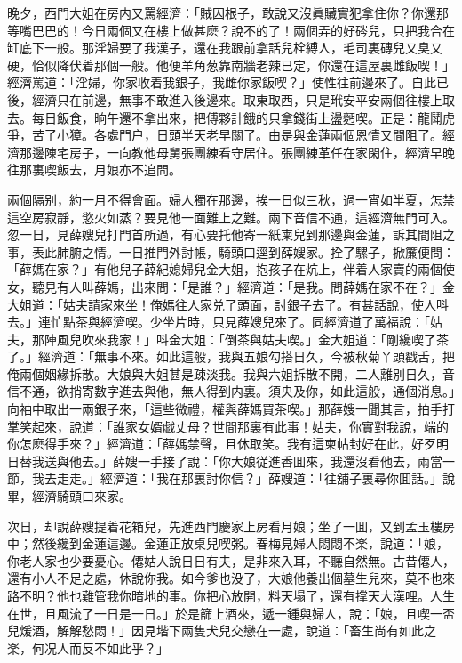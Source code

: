 晚夕，西門大姐在房内又罵經濟：「賊囚根子，敢說又沒眞贜實犯拿住你？你還那等嘴巴巴的！今日兩個又在樓上做甚麽？說不的了！兩個弄的好硶兒，只把我合在缸底下一般。那淫婦要了我漢子，還在我跟前拿話兒栓縛人，毛司裏磚兒又臭又硬，恰似降伏着那個一般。他便羊角葱靠南牆老辣已定，你還在這屋裏雌飯喫！」經濟罵道：「淫婦，你家收着我銀子，我雌你家飯喫？」使性往前邊來了。自此已後，經濟只在前邊，無事不敢進入後邊來。取東取西，只是玳安平安兩個往樓上取去。每日飯食，晌午還不拿出來，把傅夥計餓的只拿錢街上盪麪喫。正是：龍鬦虎爭，苦了小獐。各處門户，日頭半天老早關了。由是與金蓮兩個恩情又間阻了。經濟那邊陳宅房子，一向教他母舅張團練看守居住。張團練革任在家閑住，經濟早晚往那裏喫飯去，月娘亦不追問。

兩個隔别，約一月不得會面。婦人獨在那邊，挨一日似三秋，過一宵如半夏，怎禁這空房寂靜，慾火如蒸？要見他一面難上之難。兩下音信不通，這經濟無門可入。忽一日，見薛嫂兒打門首所過，有心要托他寄一紙柬兒到那邊與金蓮，訴其間阻之事，表此肺腑之情。一日推門外討帳，騎頭口逕到薛嫂家。拴了騾子，掀簾便問：「薛媽在家？」有他兒子薛紀媳婦兒金大姐，抱孩子在炕上，伴着人家賣的兩個使女，聽見有人叫薛媽，出來問：「是誰？」經濟道：「是我。問薛媽在家不在？」金大姐道：「姑夫請家來坐！俺媽往人家兑了頭面，討銀子去了。有甚話說，使人呌去。」連忙點茶與經濟喫。少坐片時，只見薛嫂兒來了。同經濟道了萬福說：「姑夫，那陣風兒吹來我家！」呌金大姐：「倒茶與姑夫喫。」金大姐道：「剛纔喫了茶了。」經濟道：「無事不來。如此這般，我與五娘勾搭日久，今被秋菊丫頭戳舌，把俺兩個姻緣拆散。大娘與大姐甚是疎淡我。我與六姐拆散不開，二人離別日久，音信不通，欲捎寄數字進去與他，無人得到内裏。須央及你，如此這般，通個消息。」向袖中取出一兩銀子來，「這些微禮，權與薛媽買茶喫。」那薛嫂一聞其言，拍手打掌笑起來，說道：「誰家女婿戯丈母？世間那裏有此事！姑夫，你實對我說，端的你怎麽得手來？」經濟道：「薛媽禁聲，且休取笑。我有這柬帖封好在此，好歹明日替我送與他去。」薛嫂一手接了說：「你大娘従進香囬來，我還沒看他去，兩當一節，我去走走。」經濟道：「我在那裏討你信？」薛嫂道：「往舖子裏尋你囬話。」說畢，經濟騎頭口來家。

次日，却說薛嫂提着花箱兒，先進西門慶家上房看月娘；坐了一囬，又到孟玉樓房中；然後纔到金蓮這邊。金蓮正放桌兒喫粥。春梅見婦人悶悶不楽，說道：「娘，你老人家也少要憂心。僊姑人說日日有夫，是非來入耳，不聽自然無。古昔僊人，還有小人不足之處，休說你我。如今爹也没了，大娘他養出個墓生兒來，莫不也來路不明？他也難管我你暗地的事。你把心放開，料天塌了，還有撑天大漢哩。人生在世，且風流了一日是一日。」於是篩上酒來，遞一鍾與婦人，說：「娘，且喫一盃兒煖酒，解解愁悶！」因見堦下兩隻犬兒交戀在一處，說道：「畜生尚有如此之楽，何况人而反不如此乎？」

